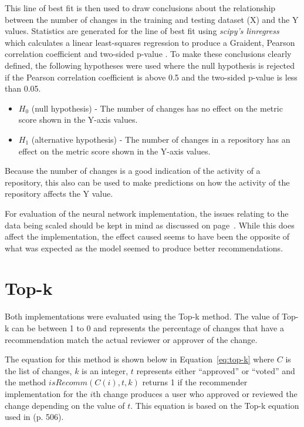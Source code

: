 This line of best fit is then used to draw conclusions about the relationship between the number of changes in the training and testing dataset (X) and the Y values. Statistics are generated for the line of best fit using \emph{scipy's linregress} which calculates a linear least-squares regression to produce a Graident, Pearson correlation coefficient and two-sided p-value \citep{scipy:linregress}. To make these conclusions clearly defined, the following hypotheses were used where the null hypothesis is rejected if the Pearson correlation coefficient is above 0.5 and the two-sided p-value is less than 0.05.
\begin{itemize}
    \item \(H_0\) (null hypothesis) - The number of changes has no effect on the metric score shown in the Y-axis values.
    \item \(H_1\) (alternative hypothesis) - The number of changes in a repository has an effect on the metric score shown in the Y-axis values.
\end{itemize}

Because the number of changes is a good indication of the activity of a repository, this also can be used to make predictions on how the activity of the repository affects the Y value.

For evaluation of the neural network implementation, the issues relating to the data being scaled should be kept in mind as discussed on page~\pageref{para:training-when-scaling-caused-issues}. While this does affect the implementation, the effect caused seems to have been the opposite of what was expected \citep{medium:importance-of-feature-scaling} as the model seemed to produce better recommendations.

\section{Top-k\label{section:evaluation-top-k}}

Both implementations were evaluated using the Top-k method. The value of Top-k can be between 1 to 0 and represents the percentage of changes that have a recommendation match the actual reviewer or approver of the change.

The equation for this method is shown below in Equation~\ref{eq:top-k} where \(C\) is the list of changes, \(k\) is an integer, \(t\) represents either ``approved'' or ``voted'' and the method \(isRecomm(C(i), t, k)\) returns 1 if the recommender implementation for the \(i\)th change produces a user who approved or reviewed the change depending on the value of \(t\). This equation is based on the Top-k equation used in \citeauthor{9240650} \citeyear{9240650} (p. 506).

